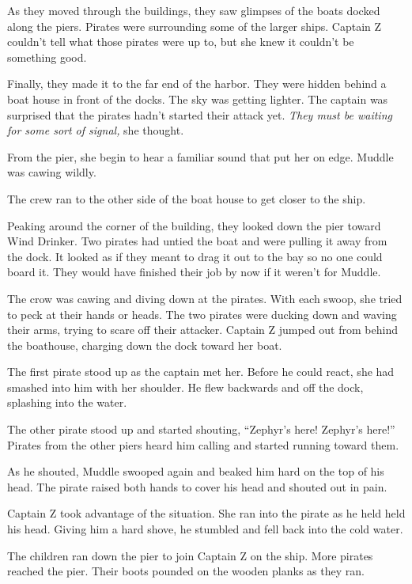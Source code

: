 \documentclass[12pt]{extbook}
\begin{document}
  As they moved through the buildings, they saw glimpses of the boats
  docked along the piers. Pirates were surrounding some of the larger
  ships. Captain Z couldn't tell what those pirates were up to, but she
  knew it couldn't be something good.
  
  Finally, they made it to the far end of the harbor. They were hidden
  behind a boat house in front of the docks. The sky was getting lighter.
  The captain was surprised that the pirates hadn't started their attack
  yet. \emph{They must be waiting for some sort of signal,} she thought.
  
  From the pier, she begin to hear a familiar sound that put her on edge.
  Muddle was cawing wildly.
  
  The crew ran to the other side of the boat house to get closer to the
  ship.
  
  Peaking around the corner of the building, they looked down the pier
  toward Wind Drinker. Two pirates had untied the boat and were pulling it
  away from the dock. It looked as if they meant to drag it out to the bay
  so no one could board it. They would have finished their job by now if
  it weren't for Muddle.
  
  The crow was cawing and diving down at the pirates. With each swoop, she
  tried to peck at their hands or heads. The two pirates were ducking down
  and waving their arms, trying to scare off their attacker. Captain Z
  jumped out from behind the boathouse, charging down the dock toward her
  boat.
  
  The first pirate stood up as the captain met her. Before he could react,
  she had smashed into him with her shoulder. He flew backwards and off
  the dock, splashing into the water.
  
  The other pirate stood up and started shouting, \enquote{Zephyr's here!
  Zephyr's here!} Pirates from the other piers heard him calling and
  started running toward them.
  
  As he shouted, Muddle swooped again and beaked him hard on the top of
  his head. The pirate raised both hands to cover his head and shouted out
  in pain.
  
  Captain Z took advantage of the situation. She ran into the pirate as he
  held held his head. Giving him a hard shove, he stumbled and fell back
  into the cold water.
  
  The children ran down the pier to join Captain Z on the ship. More
  pirates reached the pier. Their boots pounded on the wooden planks as
  they ran.
  
\end{document}

